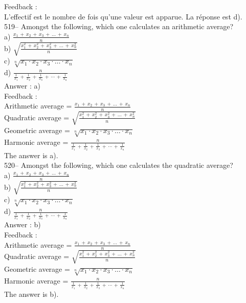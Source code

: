 ﻿\documentclass[letterpaper, 12pt]{article}
\begin{document}
Feedback : \\
L'effectif est le nombre de fois qu'une valeur est apparue.  La r\'eponse
est d).\\

519-- Amongst the following, which one calculates an arithmetic average?\\
a) $\frac{x_1\,+\,x_2\,+\,x_3\,+\,\ldots\,+\,x_n}{n}$\\[2mm]
b)
$\sqrt{\frac{x_1^{2}\,+\,x_2^{2}\,+\,x_3^{2}\,+\,\ldots\,+\,x_n^{2}}{n}}$\\[2mm]
c) $\sqrt[n]{x_1 \cdot x_2 \cdot x_3 \cdot \ldots \cdot x_n}$\\[2mm]
d)
$\frac{n}{\frac{1}{x_1}\,+\,\frac{1}{x_2}\,+\,\frac{1}{x_3}\,+\,\cdots\,+\,\frac{1}{x_n}}$\\

Answer : a)\\

Feedback : \\
Arithmetic average =
$\frac{x_1\,+\,x_2\,+\,x_3\,+\,\ldots\,+\,x_n}{n}$\\[2mm]
Quadratic average =
$\sqrt{\frac{x_1^{2}\,+\,x_2^{2}\,+\,x_3^{2}\,+\,\ldots\,+\,x_n^{2}}{n}}$\\[2mm]
Geometric average = $\sqrt[n]{x_1\cdot x_2\cdot x_3 \cdot \ldots \cdot
x_n}$\\[2mm]
Harmonic average =
$\frac{n}{\frac{1}{x_1}\,+\,\frac{1}{x_2}\,+\,\frac{1}{x_3}\,+\,\cdots\,+\,\frac{1}{x_n}}$\\[2mm]
The answer is a).\\

520-- Amongst the following, which one calculates the quadratic average?\\
a) $\frac{x_1\,+\,x_2\,+\,x_3\,+\,\ldots\,+\,x_n}{n}$\\[2mm]
b)
$\sqrt{\frac{x_1^{2}\,+\,x_2^{2}\,+\,x_3^{2}\,+\,\ldots\,+\,x_n^{2}}{n}}$\\[2mm]
c) $\sqrt[n]{x_1 \cdot x_2 \cdot x_3 \cdot \ldots \cdot x_n}$\\[2mm]
d)
$\frac{n}{\frac{1}{x_1}\,+\,\frac{1}{x_2}\,+\,\frac{1}{x_3}\,+\,\cdots\,+\,\frac{1}{x_n}}$\\

Answer : b)\\

Feedback : \\
Arithmetic average =
$\frac{x_1\,+\,x_2\,+\,x_3\,+\,\ldots\,+\,x_n}{n}$\\[2mm]
Quadratic average =
$\sqrt{\frac{x_1^{2}\,+\,x_2^{2}\,+\,x_3^{2}\,+\,\ldots\,+\,x_n^{2}}{n}}$\\[2mm]
Geometric average = $\sqrt[n]{x_1\cdot x_2\cdot x_3 \cdot \ldots \cdot
x_n}$\\[2mm]
Harmonic average =
$\frac{n}{\frac{1}{x_1}\,+\,\frac{1}{x_2}\,+\,\frac{1}{x_3}\,+\,\cdots\,+\,\frac{1}{x_n}}$\\[2mm]The answer is b).\\
\end{document}
